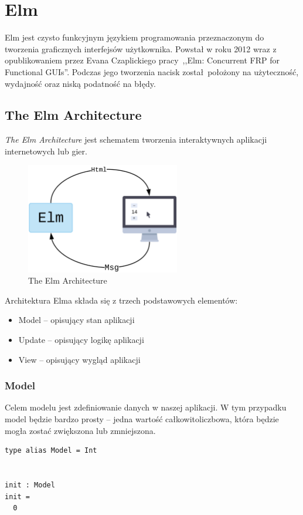 \documentclass[twoside,a4paper]{report}
\begin{document}

\chapter{Elm}
Elm\cite{elmdocs} jest czysto funkcyjnym językiem programowania przeznaczonym do tworzenia graficznych interfejsów użytkownika.
Powstał w roku 2012 wraz z opublikowaniem przez Evana Czaplickiego pracy~,,Elm: Concurrent FRP for Functional GUIs''\cite{Czaplicki2012ElmC}.
Podczas jego tworzenia nacisk został położony na użyteczność, wydajność oraz niską podatność na błędy.

\section{The Elm Architecture}
\textit{The Elm Architecture} jest schematem tworzenia interaktywnych aplikacji internetowych lub gier.
\begin{figure}[h]
    \centering
    \includegraphics[width=0.6\textwidth]{elm_arch.png}
    \caption{The Elm Architecture}\label{fig:elm_arch}
\end{figure}

Architektura Elma składa się z trzech podstawowych elementów:
\begin{itemize}
    \setlength\itemsep{-0.1em}
    \item Model -- opisujący stan aplikacji
    \item Update -- opisujący logikę aplikacji
    \item View -- opisujący wygląd aplikacji
\end{itemize}

\subsection{Model}
\begin{minipage}{.50\textwidth}
    Celem modelu jest zdefiniowanie danych w naszej aplikacji.
    W tym przypadku model będzie bardzo prosty -- jedna wartość całkowitoliczbowa, która będzie mogła zostać zwiększona lub zmniejszona.
\end{minipage}\hfill
\begin{minipage}{.45\textwidth}
    \lstset{frame=single}
    \begin{lstlisting}[caption={\textit{The Elm Architecture} - Model},label=kod:Model]
type alias Model = Int


init : Model
init =
  0
    \end{lstlisting}
\end{minipage}\hfill
\end{document}
